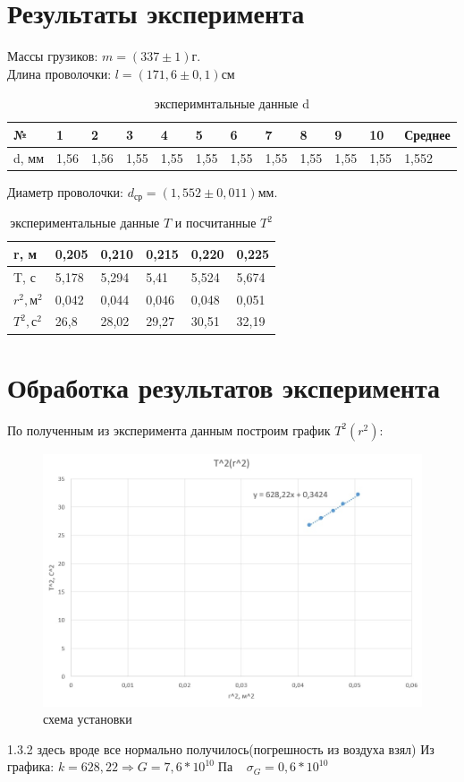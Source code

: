 \documentclass[a4paper,14pt]{extarticle}
\begin{document}
	\section{Результаты эксперимента}
	Массы грузиков: $m = (337\pm 1)$г.
	\\Длина проволочки: $l = (171,6 \pm 0,1)$см
	\begin{table}[H]
		\centering
		\begin{tabular}{|l|l|l|l|l|l|l|l|l|l|l|l|}
			\hline
			№ & 1 & 2 & 3 & 4 & 5 & 6 & 7 & 8 & 9 & 10 & Среднее \\ \hline
			d, мм & 1,56 & 1,56 & 1,55 & 1,55 & 1,55 & 1,55 & 1,55 & 1,55 & 1,55 & 1,55 & 1,552 \\ \hline
		\end{tabular}
	\caption{эксперимнтальные данные d}
	\end{table}
	Диаметр проволочки: $d_\text{ср} = (1,552 \pm 0,011)$мм.
	\begin{table}[!ht]
		\centering
		\begin{tabular}{|l|l|l|l|l|l|}
			\hline
			r, м & 0,205 & 0,210 & 0,215 & 0,220 & 0,225 \\ \hline
			T, с & 5,178 & 5,294 & 5,41 & 5,524 & 5,674 \\ \hline
			$r^2, \text{м}^2$ & 0,042 & 0,044 & 0,046 & 0,048 & 0,051 \\ \hline
			$T^2, \text{с}^2$ & 26,8 & 28,02 & 29,27 & 30,51 & 32,19 \\ \hline
		\end{tabular}
	\caption{экспериментальные данные $T$ и посчитанные $T^2$}
	\end{table}
	\section{Обработка результатов эксперимента}
	По полученным из эксперимента данным построим график $T^2(r^2)$:
	\begin{figure}[H]
		\begin{center}
			\includegraphics[scale = 0.6]{"похуй.jpg"}
			\caption{схема установки}
		\end{center}
	\end{figure}
	1.3.2 здесь вроде все нормально получилось(погрешность из воздуха взял)
	Из графика:  $k = 628,22 \Rightarrow G = 7,6*10^{10} \;\text{Па} \;\;\;\;\sigma_G = 0,6 * 10^{10}$
\end{document}

